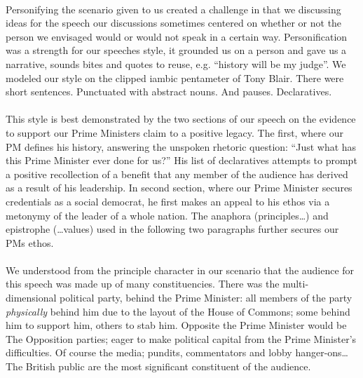\documentclass[12pt]{article}
\begin{document}
\begin{doublespace}
\paragraph{}Personifying the scenario given to us created a challenge in that we discussing ideas for the speech our discussions sometimes centered on whether or not the person we envisaged would or would not speak in a certain way. Personification was a strength for our speeches style, it grounded us on a person and gave us a narrative, sounds bites and quotes to reuse, e.g. ``history will be my judge''. We modeled our style on the clipped iambic pentameter of Tony Blair. There were short sentences. Punctuated with abstract nouns. And pauses. Declaratives.

\paragraph{}This style is best demonstrated by the two sections of our speech on the evidence to support our Prime Ministers claim to a positive legacy. The first, where our PM defines his history, answering the unspoken rhetoric question: ``Just what has this Prime Minister ever done for us?'' His list of declaratives attempts to prompt a positive recollection of a benefit that any member of the audience has derived as a result of his leadership. In second section, where our Prime Minister secures credentials as a social democrat, he first makes an appeal to his ethos via a metonymy of the leader of a whole nation. The anaphora (principles\ldots) and epistrophe (\ldots values) used in the following two paragraphs further secures our PMs ethos.

\paragraph{}We understood from the principle character in our scenario that the audience for this speech was made up of many constituencies. There was the multi-dimensional political party, behind the Prime Minister: all members of the party \emph{physically} behind him due to the layout of the House of Commons; some behind him to support him, others to stab him. Opposite the Prime Minister would be The Opposition parties; eager to make political capital from the Prime Minister's difficulties. Of course the media; pundits, commentators and lobby hanger-ons\ldots The British public are the most significant constituent of the audience. 


\end{doublespace}
\end{document}
